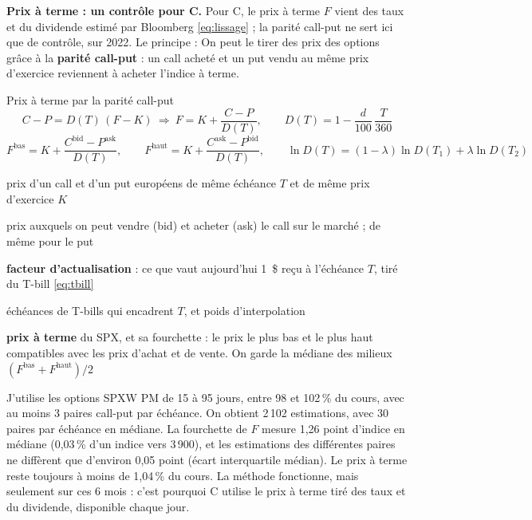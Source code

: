\documentclass[10pt,a4paper]{article}
\newcommand{\notation}[2]{\makebox[2.3cm][l]{#1}\parbox[t]{\dimexpr\linewidth-2.3cm\relax}{#2}\par}
\begin{document}
\textbf{Prix à terme : un contrôle pour C.} Pour C, le prix à terme $F$ vient des taux et du dividende estimé par Bloomberg \eqref{eq:lissage} ; la parité call-put ne sert ici que de contrôle, sur 2022. Le principe : On peut le tirer des prix des options grâce à la \textbf{parité call-put} : un call acheté et un put vendu au même prix d'exercice reviennent à acheter l'indice à terme.
\begin{formule}{Prix à terme par la parité call-put \cite{hull}}
\begin{equation}\label{eq:parite}
C-P=D(T)\,(F-K)\ \Rightarrow\ F=K+\frac{C-P}{D(T)},\qquad D(T)=1-\frac{d}{100}\,\frac{T}{360}
\end{equation}
\begin{equation}\label{eq:bornes}
F^{\mathrm{bas}}=K+\frac{C^{\mathrm{bid}}-P^{\mathrm{ask}}}{D(T)},\qquad F^{\mathrm{haut}}=K+\frac{C^{\mathrm{ask}}-P^{\mathrm{bid}}}{D(T)},\qquad \ln D(T)=(1-\lambda)\ln D(T_1)+\lambda\ln D(T_2)
\end{equation}
\notation{$C,\ P$}{prix d'un call et d'un put européens de même échéance $T$ et de même prix d'exercice $K$}
\notation{$C^{\mathrm{bid}},C^{\mathrm{ask}}$}{prix auxquels on peut vendre (bid) et acheter (ask) le call sur le marché ; de même pour le put}
\notation{$D(T)$}{\textbf{facteur d'actualisation} : ce que vaut aujourd'hui 1~\$ reçu à l'échéance $T$, tiré du T-bill \eqref{eq:tbill}}
\notation{$T_1,T_2,\lambda$}{échéances de T-bills qui encadrent $T$, et poids d'interpolation}
\notation{$F;\ F^{\mathrm{bas}},F^{\mathrm{haut}}$}{\textbf{prix à terme} du SPX, et sa fourchette : le prix le plus bas et le plus haut compatibles avec les prix d'achat et de vente. On garde la médiane des milieux $(F^{\mathrm{bas}}+F^{\mathrm{haut}})/2$}
\end{formule}
J'utilise les options SPXW PM de 15 à 95 jours, entre 98 et 102\,\% du cours, avec au moins 3 paires call-put par échéance. On obtient 2\,102 estimations, avec 30 paires par échéance en médiane. La fourchette de $F$ mesure 1,26 point d'indice en médiane (0,03\,\% d'un indice vers 3\,900), et les estimations des différentes paires ne diffèrent que d'environ 0,05 point (écart interquartile médian). Le prix à terme reste toujours à moins de 1,04\,\% du cours. La méthode fonctionne, mais seulement sur ces 6 mois : c'est pourquoi C utilise le prix à terme tiré des taux et du dividende, disponible chaque jour.
\end{document}
